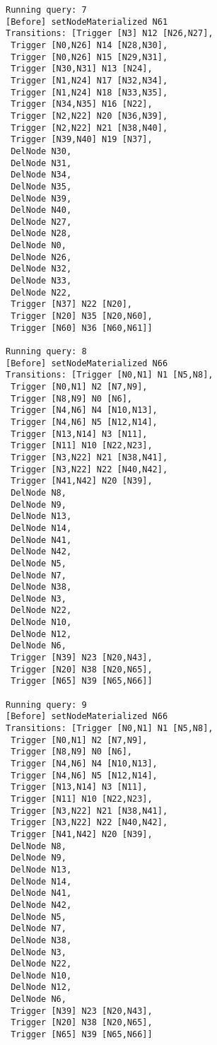 \begin{code}
\begin{verbatim}
Running query: 7
[Before] setNodeMaterialized N61
Transitions: [Trigger [N3] N12 [N26,N27],
 Trigger [N0,N26] N14 [N28,N30],
 Trigger [N0,N26] N15 [N29,N31],
 Trigger [N30,N31] N13 [N24],
 Trigger [N1,N24] N17 [N32,N34],
 Trigger [N1,N24] N18 [N33,N35],
 Trigger [N34,N35] N16 [N22],
 Trigger [N2,N22] N20 [N36,N39],
 Trigger [N2,N22] N21 [N38,N40],
 Trigger [N39,N40] N19 [N37],
 DelNode N30,
 DelNode N31,
 DelNode N34,
 DelNode N35,
 DelNode N39,
 DelNode N40,
 DelNode N27,
 DelNode N28,
 DelNode N0,
 DelNode N26,
 DelNode N32,
 DelNode N33,
 DelNode N22,
 Trigger [N37] N22 [N20],
 Trigger [N20] N35 [N20,N60],
 Trigger [N60] N36 [N60,N61]]

Running query: 8
[Before] setNodeMaterialized N66
Transitions: [Trigger [N0,N1] N1 [N5,N8],
 Trigger [N0,N1] N2 [N7,N9],
 Trigger [N8,N9] N0 [N6],
 Trigger [N4,N6] N4 [N10,N13],
 Trigger [N4,N6] N5 [N12,N14],
 Trigger [N13,N14] N3 [N11],
 Trigger [N11] N10 [N22,N23],
 Trigger [N3,N22] N21 [N38,N41],
 Trigger [N3,N22] N22 [N40,N42],
 Trigger [N41,N42] N20 [N39],
 DelNode N8,
 DelNode N9,
 DelNode N13,
 DelNode N14,
 DelNode N41,
 DelNode N42,
 DelNode N5,
 DelNode N7,
 DelNode N38,
 DelNode N3,
 DelNode N22,
 DelNode N10,
 DelNode N12,
 DelNode N6,
 Trigger [N39] N23 [N20,N43],
 Trigger [N20] N38 [N20,N65],
 Trigger [N65] N39 [N65,N66]]

Running query: 9
[Before] setNodeMaterialized N66
Transitions: [Trigger [N0,N1] N1 [N5,N8],
 Trigger [N0,N1] N2 [N7,N9],
 Trigger [N8,N9] N0 [N6],
 Trigger [N4,N6] N4 [N10,N13],
 Trigger [N4,N6] N5 [N12,N14],
 Trigger [N13,N14] N3 [N11],
 Trigger [N11] N10 [N22,N23],
 Trigger [N3,N22] N21 [N38,N41],
 Trigger [N3,N22] N22 [N40,N42],
 Trigger [N41,N42] N20 [N39],
 DelNode N8,
 DelNode N9,
 DelNode N13,
 DelNode N14,
 DelNode N41,
 DelNode N42,
 DelNode N5,
 DelNode N7,
 DelNode N38,
 DelNode N3,
 DelNode N22,
 DelNode N10,
 DelNode N12,
 DelNode N6,
 Trigger [N39] N23 [N20,N43],
 Trigger [N20] N38 [N20,N65],
 Trigger [N65] N39 [N65,N66]]


\end{verbatim}
\end{code}
